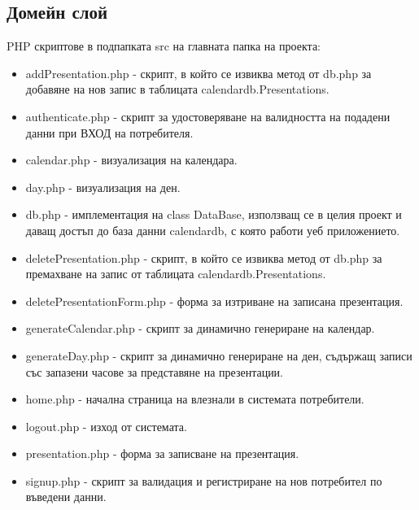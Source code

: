 \documentclass[12pt]{article}
\begin{document}
\subsection{Домейн слой}
\noindent PHP скриптове в подпапката src на главната папка на проекта:
\begin{itemize}
    \item addPresentation.php - скрипт, в който се извиква метод от db.php за добавяне на нов запис в таблицата calendardb.Presentations.
    
    \item authenticate.php - скрипт за удостоверяване на валидността на подадени данни при ВХОД на потребителя.
    
    \item calendar.php - визуализация на календара.
    
    \item day.php - визуализация на ден.
    
    \item db.php - имплементация на class DataBase, използващ се в целия проект и даващ достъп до база данни calendardb, с която работи уеб приложението.
    
    \item deletePresentation.php - скрипт, в който се извиква метод от db.php за премахване на запис от таблицата calendardb.Presentations.
    
    \item deletePresentationForm.php - форма за изтриване на записана презентация.
    
    \item generateCalendar.php - скрипт за динамично генериране на календар.
    
    \item generateDay.php - скрипт за динамично генериране на ден, съдържащ записи със запазени часове за представяне на презентации.
    
    \item home.php - начална страница на влезнали в системата потребители.
    
    \item logout.php - изход от системата.
    
    \item presentation.php - форма за записване на презентация.
    
    \item signup.php - скрипт за валидация и регистриране на нов потребител по въведени данни.
\end{itemize}
\end{document}
